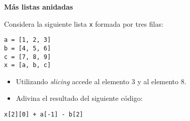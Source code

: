 \documentclass[a4paper, 11pt]{scrartcl}
\newenvironment{code}{\begin{tcolorbox}[colback=red!2!white]}{\end{tcolorbox}}
\begin{document}
\noindent\textbf{\sffamily \dag{} Más listas anidadas}

Considera la siguiente lista \verb|x| formada por \guillemotleft tres filas\guillemotright:

\smallskip

\begin{code}

\begin{verbatim}
a = [1, 2, 3]
b = [4, 5, 6]
c = [7, 8, 9]
x = [a, b, c]
\end{verbatim}

\end{code}

\begin{itemize}



\item  Utilizando \textit{slicing} accede al elemento 3 y al elemento 8.

\item Adivina el resultado del siguiente código:

\end{itemize}

\smallskip

\begin{code}

\begin{verbatim}
x[2][0] + a[-1] - b[2]
\end{verbatim}

\end{code}
\end{document}
